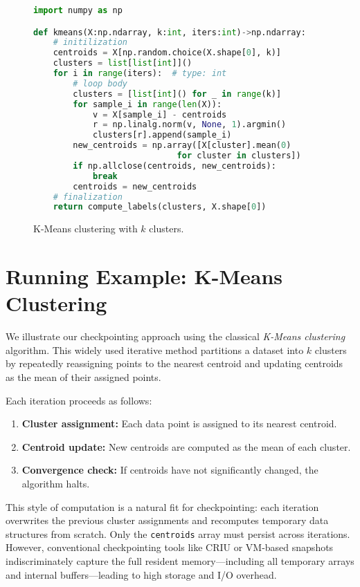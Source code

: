 
\begin{figure}[t]
\begin{lstlisting}[language=python]
import numpy as np

def kmeans(X:np.ndarray, k:int, iters:int)->np.ndarray:
    # initilization
    centroids = X[np.random.choice(X.shape[0], k)]
    clusters = list[list[int]]()
    for i in range(iters):  # type: int
        # loop body
        clusters = [list[int]() for _ in range(k)]
        for sample_i in range(len(X)):
            v = X[sample_i] - centroids
            r = np.linalg.norm(v, None, 1).argmin()
            clusters[r].append(sample_i)
        new_centroids = np.array([X[cluster].mean(0)
                             for cluster in clusters])
        if np.allclose(centroids, new_centroids):
            break
        centroids = new_centroids
    # finalization
    return compute_labels(clusters, X.shape[0])
\end{lstlisting}
\caption{\label{lst:code-kmeans}
K-Means clustering with $k$ clusters.}
\end{figure}

\section{Running Example: K-Means Clustering}
\label{sec:running-example}

We illustrate our checkpointing approach using the classical \emph{K-Means clustering} algorithm. This widely used iterative method partitions a dataset into $k$ clusters by repeatedly reassigning points to the nearest centroid and updating centroids as the mean of their assigned points.

Each iteration proceeds as follows:
\begin{enumerate}
    \item \textbf{Cluster assignment:} Each data point is assigned to its nearest centroid.
    \item \textbf{Centroid update:} New centroids are computed as the mean of each cluster.
    \item \textbf{Convergence check:} If centroids have not significantly changed, the algorithm halts.
\end{enumerate}

This style of computation is a natural fit for checkpointing: each iteration overwrites the previous cluster assignments and recomputes temporary data structures from scratch. Only the \texttt{centroids} array must persist across iterations. However, conventional checkpointing tools like CRIU or VM-based snapshots indiscriminately capture the full resident memory---including all temporary arrays and internal buffers---leading to high storage and I/O overhead.

